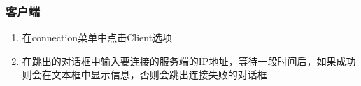 \documentclass[a4paper,10pt]{article}
\begin{document}
                \subsubsection{客户端}
                        \begin{enumerate}
                         \item 在connection菜单中点击Client选项
                         \item 在跳出的对话框中输入要连接的服务端的IP地址，等待一段时间后，如果成功则会在文本框中显示信息，否则会跳出连接失败的对话框
                                \begin{figure}[htbp]
                                        \centering
\end{figure}
\end{enumerate}
\end{document}
